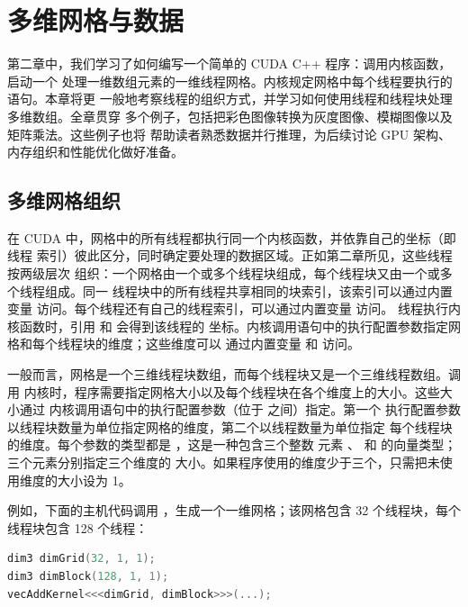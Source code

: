 \chapter{多维网格与数据}
\label{chap:multidimensional-grids-and-data}
\chaptercontents

\setcounter{footnote}{0}

第二章中，我们学习了如何编写一个简单的 CUDA C++ 程序：调用内核函数，启动一个
处理一维数组元素的一维线程网格。内核规定网格中每个线程要执行的语句。本章将更
一般地考察线程的组织方式，并学习如何使用线程和线程块处理多维数组。全章贯穿
多个例子，包括把彩色图像转换为灰度图像、模糊图像以及矩阵乘法。这些例子也将
帮助读者熟悉数据并行推理，为后续讨论 GPU 架构、内存组织和性能优化做好准备。

\section{多维网格组织}
\label{sec:multidimensional-grid-organization}

在 CUDA 中，网格中的所有线程都执行同一个内核函数，并依靠自己的坐标（即线程
索引）彼此区分，同时确定要处理的数据区域。正如第二章所见，这些线程按两级层次
组织：一个网格由一个或多个线程块组成，每个线程块又由一个或多个线程组成。同一
线程块中的所有线程共享相同的块索引，该索引可以通过内置变量 
访问。每个线程还有自己的线程索引，可以通过内置变量  访问。
线程执行内核函数时，引用  和  会得到该线程的
坐标。内核调用语句中的执行配置参数指定网格和每个线程块的维度；这些维度可以
通过内置变量  和  访问。

一般而言，网格是一个三维线程块数组，而每个线程块又是一个三维线程数组。调用
内核时，程序需要指定网格大小以及每个线程块在各个维度上的大小。这些大小通过
内核调用语句中的执行配置参数（位于  之间）指定。第一个
执行配置参数以线程块数量为单位指定网格的维度，第二个以线程数量为单位指定
每个线程块的维度。每个参数的类型都是 ，这是一种包含三个整数
元素 、 和  的向量类型；三个元素分别指定三个维度的
大小。如果程序使用的维度少于三个，只需把未使用维度的大小设为 1。

例如，下面的主机代码调用 ，生成一个一维网格；该网格包含
32 个线程块，每个线程块包含 128 个线程：

\begin{lstlisting}[language=C++]
dim3 dimGrid(32, 1, 1);
dim3 dimBlock(128, 1, 1);
vecAddKernel<<<dimGrid, dimBlock>>>(...);
\end{lstlisting}

